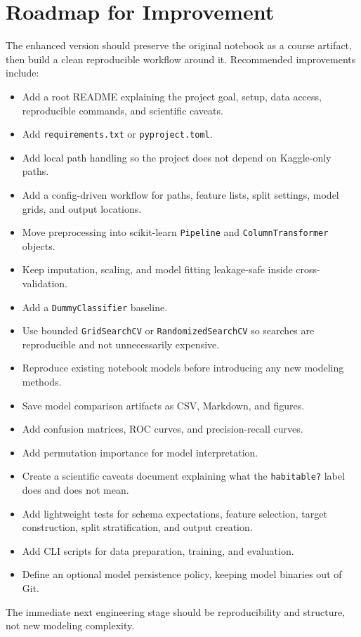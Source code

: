 \documentclass[11pt]{article}
\begin{document}
\section{Roadmap for Improvement}

The enhanced version should preserve the original notebook as a course artifact, then build a clean reproducible workflow around it. Recommended improvements include:

\begin{itemize}
  \item Add a root README explaining the project goal, setup, data access, reproducible commands, and scientific caveats.
  \item Add \texttt{requirements.txt} or \texttt{pyproject.toml}.
  \item Add local path handling so the project does not depend on Kaggle-only paths.
  \item Add a config-driven workflow for paths, feature lists, split settings, model grids, and output locations.
  \item Move preprocessing into scikit-learn \texttt{Pipeline} and \texttt{ColumnTransformer} objects.
  \item Keep imputation, scaling, and model fitting leakage-safe inside cross-validation.
  \item Add a \texttt{DummyClassifier} baseline.
  \item Use bounded \texttt{GridSearchCV} or \texttt{RandomizedSearchCV} so searches are reproducible and not unnecessarily expensive.
  \item Reproduce existing notebook models before introducing any new modeling methods.
  \item Save model comparison artifacts as CSV, Markdown, and figures.
  \item Add confusion matrices, ROC curves, and precision-recall curves.
  \item Add permutation importance for model interpretation.
  \item Create a scientific caveats document explaining what the \texttt{habitable?} label does and does not mean.
  \item Add lightweight tests for schema expectations, feature selection, target construction, split stratification, and output creation.
  \item Add CLI scripts for data preparation, training, and evaluation.
  \item Define an optional model persistence policy, keeping model binaries out of Git.
\end{itemize}

The immediate next engineering stage should be reproducibility and structure, not new modeling complexity.

\newpage


\end{document}
